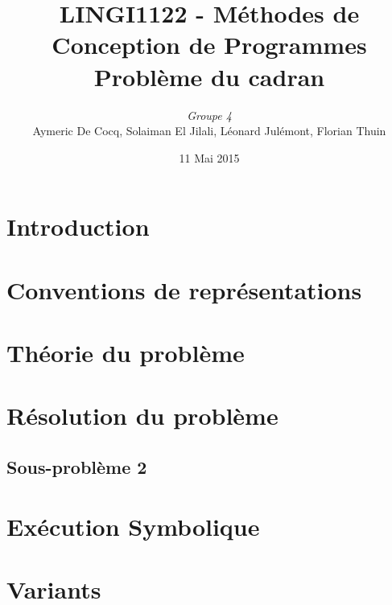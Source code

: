 \documentclass[11pt,a4paper]{article}
\author{\textit{Groupe 4}\\
Aymeric De Cocq, Solaiman El Jilali, Léonard Julémont, Florian Thuin}
\title{LINGI1122 - Méthodes de Conception de Programmes\\
Problème du cadran}
\date{11 Mai 2015}
\begin{document}
\maketitle

\section* {Introduction}


\section{Conventions de représentations}

\section{Théorie du problème}




\section{Résolution du problème}




\subsection{Sous-problème 2}

\section{Exécution Symbolique}

\section{Variants}
\end{document}
